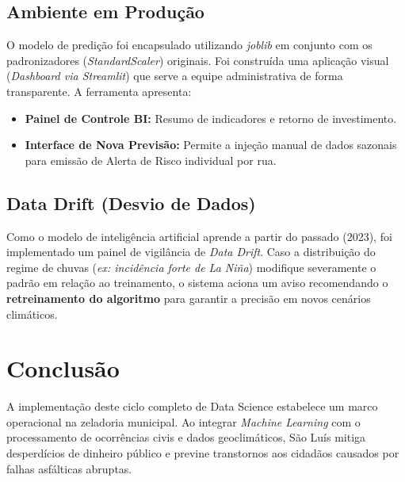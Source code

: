 \documentclass[12pt,a4paper]{article}
\begin{document}
\subsection{Ambiente em Produção}
O modelo de predição foi encapsulado utilizando \textit{joblib} em conjunto com os padronizadores (\textit{StandardScaler}) originais. Foi construída uma aplicação visual (\textit{Dashboard via Streamlit}) que serve a equipe administrativa de forma transparente. A ferramenta apresenta:
\begin{itemize}
    \item \textbf{Painel de Controle BI:} Resumo de indicadores e retorno de investimento.
    \item \textbf{Interface de Nova Previsão:} Permite a injeção manual de dados sazonais para emissão de Alerta de Risco individual por rua.
\end{itemize}

\subsection{Data Drift (Desvio de Dados)}
Como o modelo de inteligência artificial aprende a partir do passado (2023), foi implementado um painel de vigilância de \textit{Data Drift}. Caso a distribuição do regime de chuvas (\textit{ex: incidência forte de La Niña}) modifique severamente o padrão em relação ao treinamento, o sistema aciona um aviso recomendando o \textbf{retreinamento do algoritmo} para garantir a precisão em novos cenários climáticos.

\section{Conclusão}
A implementação deste ciclo completo de Data Science estabelece um marco operacional na zeladoria municipal. Ao integrar \textit{Machine Learning} com o processamento de ocorrências civis e dados geoclimáticos, São Luís mitiga desperdícios de dinheiro público e previne transtornos aos cidadãos causados por falhas asfálticas abruptas.
\end{document}
